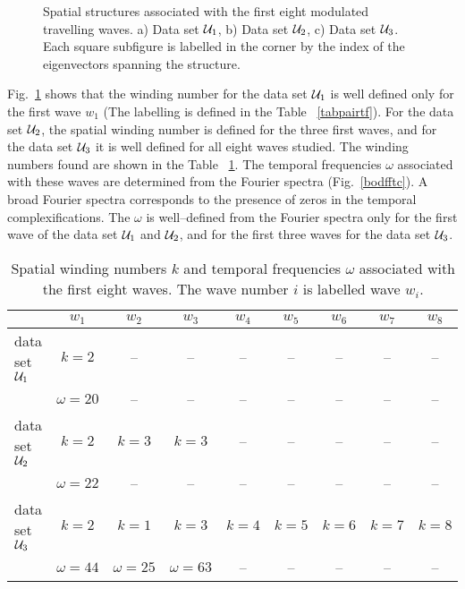 \begin{figure}
\centering
{}
\caption{Spatial structures associated with the first eight modulated 
travelling waves. a) Data set ${\cal U}_1$,  b) Data set 
${\cal U}_2$, c) Data set ${\cal U}_3$. Each square subfigure is
labelled in the corner 
by the index of the eigenvectors spanning the structure.}
\label{strucx}
\end{figure}

Fig.~\ref{strucx} shows that the winding number for the data set 
${\cal U}_1$ is well defined only for the first wave $w_1$ (The 
labelling is defined in the Table ~\ref{tabpairtf}). 
For the data set ${\cal U}_2$, the spatial winding number is defined 
for the three first waves, and for the data set ${\cal U}_3$ it is well
defined for all eight waves studied. The winding numbers found 
are shown in the Table ~\ref{tabkomeg}. 
The temporal frequencies $\omega$ associated with these waves are 
determined from the Fourier spectra (Fig.~\ref{bodfftc}).
A broad Fourier spectra corresponds
to the presence of zeros in the temporal complexifications.
The $\omega$ is well--defined from the Fourier spectra only for 
the first wave of the data set 
${\cal U}_1$ and ${\cal U}_2$, and for the first three waves for the 
data set ${\cal U}_3$. 

\begin{table}[htb]
 \begin{center}
  \caption{Spatial winding numbers $k$ and temporal frequencies $\omega$
associated with the first eight waves. The wave number $i$ is labelled 
wave $w_i$. }
  \label{tabkomeg}
  \begin{tabular}{l|c|c|c|c|c|c|c|c|}
          &$w_1$&$w_2$&$w_3$&$w_4$&$w_5$&$w_6$&$w_7$&$w_8$\\ \hline
data set ${\cal U}_1$ &$k=2$      & -- & --& -- & --& -- & -- & --\\
             &$\omega=20$& -- & --& -- & --& -- & -- & --\\ \hline
data set ${\cal U}_2$ &$k=2$      &$k=3$ & $k=3$ & -- & --& -- &
 -- & --\\
             &$\omega=22$& -- & --& -- & --& -- & -- & --\\ \hline
data set ${\cal U}_3$ &$k=2$      &$k=1$ & $k=3$&$k=4$&$k=5$ &
 $k=6$&$k=7$ & $k=8$ \\
             &$\omega=44$&$\omega=25$&$\omega=63$& -- & --& -- & 
-- & --\\ \hline
  \end{tabular}
 \end{center}
\end{table}

